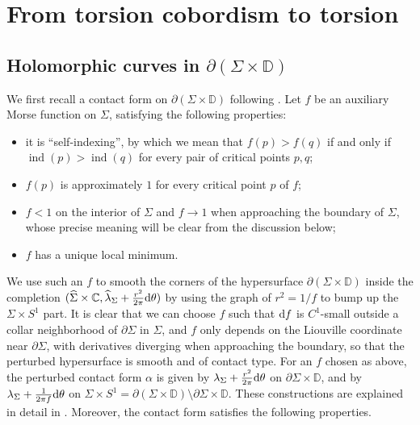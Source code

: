 \documentclass[11pt]{amsart}
\numberwithin{equation}{section}
\def\C{{\mathbb C}}
\def\D{{\mathbb D}}
\def\rd{{\rm d}}
\DeclareMathOperator{\ind}{ind}
\begin{document}
\section{From torsion cobordism to torsion}\label{s:torsion}
\subsection{Holomorphic curves in $\partial(\Sigma\times \D)$}\label{ss:curve}
We first recall a contact form on $\partial(\Sigma \times \D)$ following \cite[\S 2.1]{zbMATH07673358}. Let $f$ be an auxiliary Morse function on $\Sigma$, satisfying the following properties: 
\begin{itemize}
    \item it is ``self-indexing'', by which we mean that $f(p)>f(q)$ if and only if $\ind (p) > \ind (q)$ for every pair of critical points $p,q$;
    \item $f(p)$ is approximately $1$ for every critical point $p$ of $f$;
    \item $f<1$ on the interior of $\Sigma$ and $f\to 1$ when approaching the boundary of $\Sigma$, whose precise meaning will be clear from the discussion below;
    \item $f$ has a unique local minimum.
\end{itemize}
We use such an $f$ to smooth the corners of the hypersurface $\partial(\Sigma \times \D)$ inside the completion $(\widehat{\Sigma}\times \C, \widehat{\lambda}_\Sigma+\frac{r^2}{2\pi}\rd \theta)$ by using the graph of $r^2=1/f$ to bump up the $\Sigma \times S^1$ part. It is clear that we can choose $f$ such that $\rd f$ is $C^1$-small outside a collar neighborhood of $\partial \Sigma$ in $\Sigma$, and $f$ only depends on the Liouville coordinate near $\partial \Sigma$, with derivatives diverging when approaching the boundary, so that the perturbed hypersurface is smooth and of contact type. For an $f$ chosen as above, the perturbed contact form $\alpha$ is given by $\lambda_\Sigma+\frac{r^2}{2\pi}\rd \theta$ on $\partial \Sigma \times \D$, and by $\lambda_\Sigma +\frac{1}{2\pi f} \rd \theta$ on $\Sigma \times S^1 = \partial(\Sigma \times \D)\setminus  \partial \Sigma \times \D$. These constructions are explained in detail in \cite[\S 2.1]{zbMATH07673358}. Moreover, the contact form satisfies the following properties.
\end{document}
